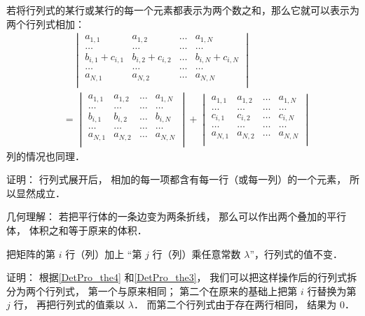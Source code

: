 \begin{theorem}{}\label{DetPro_the4}
若将行列式的某行或某行的每一个元素都表示为两个数之和，那么它就可以表示为两个行列式相加：
\begin{equation}\label{DetPro_eq1}
\begin{aligned}
&\quad\begin{vmatrix}
a_{1,1} & a_{1,2} & \dots & a_{1,N}\\
\dots & \dots & \dots & \dots\\
b_{i,1} + c_{i,1} & b_{i, 2} + c_{i, 2} & \dots & b_{i,N} + c_{i,N}\\
\dots & \dots & \dots & \dots\\
a_{N,1} & a_{N,2} & \dots & a_{N,N}\\
\end{vmatrix}\\
&=
\begin{vmatrix}
a_{1,1} & a_{1,2} & \dots & a_{1,N}\\
\dots & \dots & \dots & \dots\\
b_{i,1} & b_{i, 2} & \dots & b_{i,N}\\
\dots & \dots & \dots & \dots\\
a_{N,1} & a_{N,2} & \dots & a_{N,N}\\
\end{vmatrix}
+
\begin{vmatrix}
a_{1,1} & a_{1,2} & \dots & a_{1,N}\\
\dots & \dots & \dots & \dots\\
c_{i,1} & c_{i, 2} & \dots & c_{i,N}\\
\dots & \dots & \dots & \dots\\
a_{N,1} & a_{N,2} & \dots & a_{N,N}\\
\end{vmatrix}
\end{aligned}
\end{equation}
列的情况也同理．
\end{theorem}
证明： 行列式展开后， 相加的每一项都含有每一行（或每一列）的一个元素， 所以显然成立．

几何理解： 若把平行体的一条边变为两条折线， 那么可以作出两个叠加的平行体， 体积之和等于原来的体积．

\begin{theorem}{ }\label{DetPro_the5}
把矩阵的第 $i$ 行（列）加上 “第 $j$ 行（列）乘任意常数 $\lambda$”，行列式的值不变．
\end{theorem}
证明： 根据\autoref{DetPro_the4} 和\autoref{DetPro_the3}， 我们可以把这样操作后的行列式拆分为两个行列式， 第一个与原来相同； 第二个在原来的基础上把第 $i$ 行替换为第 $j$ 行， 再把行列式的值乘以 $\lambda$． 而第二个行列式由于存在两行相同， 结果为 0．


